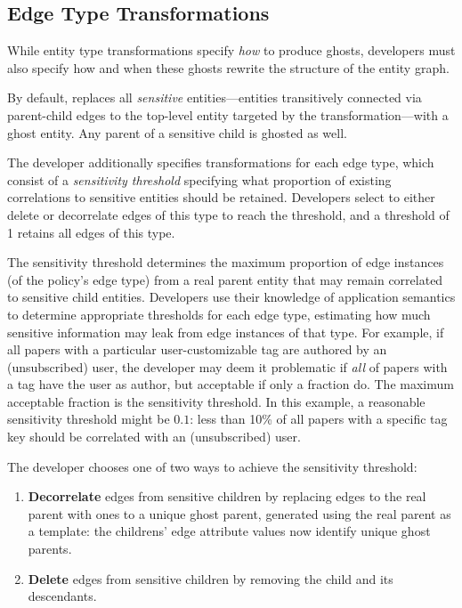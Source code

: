 \subsection{Edge Type Transformations}
\label{design:edgepol}
While entity type transformations specify \emph{how} to produce ghosts, developers must also specify
how and when these ghosts rewrite the structure of the entity graph.  

By default, \sys replaces all \emph{sensitive} entities---entities transitively connected via parent-child edges
to the top-level entity targeted by the transformation---with a ghost entity.  Any
parent of a sensitive child is ghosted as well. 

The developer additionally specifies transformations for each edge type, which consist of a
\emph{sensitivity threshold} specifying what proportion of existing correlations to sensitive
entities should be retained. Developers select to either delete or decorrelate edges of this type to reach
the threshold, and a threshold of 1 retains all edges of this type. 

The sensitivity threshold determines the maximum proportion of edge instances (of the policy's edge
type) from a real parent entity that may remain correlated to sensitive child entities.
Developers use their knowledge of application semantics to determine appropriate thresholds for each
edge type, estimating how much sensitive information may leak from edge instances of that type. 
For example, if all papers with a particular user-customizable tag are authored by an (unsubscribed)
user, the developer may deem it problematic if \emph{all} of papers with a tag have the user as
author, but acceptable if only a fraction do.  The maximum acceptable fraction is the sensitivity threshold. In this example, a reasonable sensitivity threshold might be $0.1$: less than 10\% of all papers with a specific tag key should be correlated with an (unsubscribed) user. 

The developer chooses one of two ways to achieve the sensitivity threshold: 
\begin{enumerate}
    \item \textbf{Decorrelate} edges from sensitive children by replacing edges to the real parent with
        ones to a unique ghost parent, generated using the real parent as a template:
        the childrens' edge attribute values now identify unique ghost parents. 

    \item \textbf{Delete} edges from sensitive children by removing the child and its descendants. 
\end{enumerate}


